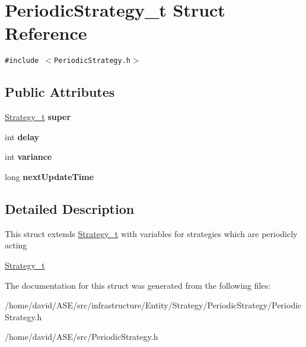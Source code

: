 \hypertarget{structPeriodicStrategy__t}{
\section{PeriodicStrategy\_\-t Struct Reference}
\label{structPeriodicStrategy__t}
}
{\tt \#include $<$PeriodicStrategy.h$>$}

\subsection*{Public Attributes}
\begin{CompactItemize}
\item 
\hypertarget{structPeriodicStrategy__t_24d21b615e8611bd8267b8bbc7c9f88c}{
\hyperlink{structStrategy__t}{Strategy\_\-t} \textbf{super}}
\label{structPeriodicStrategy__t_24d21b615e8611bd8267b8bbc7c9f88c}

\item 
\hypertarget{structPeriodicStrategy__t_0f058a838a49754bc4d437c33e232399}{
int \textbf{delay}}
\label{structPeriodicStrategy__t_0f058a838a49754bc4d437c33e232399}

\item 
\hypertarget{structPeriodicStrategy__t_749026afc6f19a4a3a30fb7fa8155eaf}{
int \textbf{variance}}
\label{structPeriodicStrategy__t_749026afc6f19a4a3a30fb7fa8155eaf}

\item 
\hypertarget{structPeriodicStrategy__t_0158f19fb85c628ca5d61785068916e9}{
long \textbf{nextUpdateTime}}
\label{structPeriodicStrategy__t_0158f19fb85c628ca5d61785068916e9}

\end{CompactItemize}


\subsection{Detailed Description}
This struct extends \hyperlink{structStrategy__t}{Strategy\_\-t} with variables for strategies which are periodicly acting

\hyperlink{structStrategy__t}{Strategy\_\-t} 

The documentation for this struct was generated from the following files:\begin{CompactItemize}
\item 
/home/david/ASE/src/infrastructure/Entity/Strategy/PeriodicStrategy/PeriodicStrategy.h\item 
/home/david/ASE/src/PeriodicStrategy.h\end{CompactItemize}
